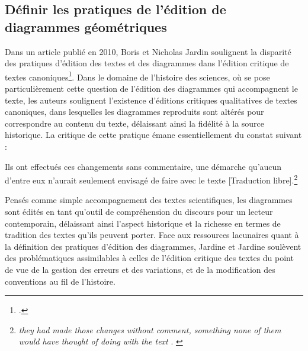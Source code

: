 
\subsection{Définir les pratiques de l'édition de diagrammes géométriques}
	Dans un article publié en 2010, Boris et Nicholas Jardin soulignent la disparité des pratiques d'édition des textes et des diagrammes dans l'édition critique de textes canoniques\footcite{jardineCriticalEditingEarlyModern2010}. Dans le domaine de l'histoire des sciences, où se pose particulièrement cette question de l'édition des diagrammes qui accompagnent le texte, les auteurs soulignent l'existence d'éditions critiques qualitatives de textes canoniques, dans lesquelles les diagrammes reproduits sont altérés pour correspondre au contenu du texte, délaissant ainsi la fidélité à la source historique. La critique de cette pratique émane essentiellement du constat suivant :
	
	\begin{displayquote}
		Ils ont effectués ces changements sans commentaire, une démarche qu'aucun d'entre eux n'aurait seulement envisagé de faire avec le texte [Traduction libre].\footnote{\textit{\og they had made those changes without comment, something none of them would have thought of doing with the text \fg}. \cite{jardineCriticalEditingEarlyModern2010}}
	\end{displayquote}
    
    Pensés comme simple accompagnement des textes scientifiques, les diagrammes sont édités en tant qu'outil de compréhension du discours pour un lecteur contemporain, délaissant ainsi l'aspect historique et la richesse en termes de tradition des textes qu'ils peuvent porter. Face aux ressources lacunaires quant à la définition des pratiques d'édition des diagrammes, Jardine et Jardine soulèvent des problématiques assimilables à celles de l'édition critique des textes du point de vue de la gestion des erreurs et des variations, et de la modification des conventions au fil de l'histoire. 
    
